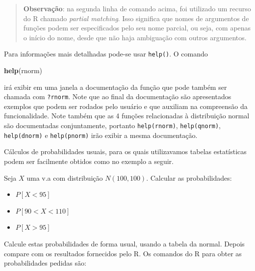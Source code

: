 \documentclass[10pt,a4paper]{book}
\newenvironment{Shaded}{\begin{snugshade}}{\end{snugshade}}
\newcommand{\KeywordTok}[1]{\textcolor[rgb]{0.13,0.29,0.53}{\textbf{#1}}}
\newcommand{\NormalTok}[1]{#1}
\providecommand{\tightlist}{%
  \setlength{\itemsep}{0pt}\setlength{\parskip}{0pt}}
\begin{document}
\begin{quote}
\textbf{Observação}: na segunda linha de comando acima, foi utilizado um
recurso do R chamado \emph{partial matching}. Isso significa que nomes
de argumentos de funções podem ser especificados pelo seu nome parcial,
ou seja, com apenas o início do nome, desde que não haja ambiguação com
outros argumentos.
\end{quote}

Para informações mais detalhadas pode-se usar \texttt{help()}. O comando

\begin{Shaded}
\begin{Highlighting}[]
\KeywordTok{help}\NormalTok{(rnorm)}
\end{Highlighting}
\end{Shaded}

irá exibir em uma janela a documentação da função que pode também ser
chamada com \texttt{?rnorm}. Note que ao final da documentação são
apresentados exemplos que podem ser rodados pelo usuário e que auxiliam
na compreensão da funcionalidade. Note também que as 4 funções
relacionadas à distribuição normal são documentadas conjuntamente,
portanto \texttt{help(rnorm)}, \texttt{help(qnorm)},
\texttt{help(dnorm)} e \texttt{help(pnorm)} irão exibir a mesma
documentação.

Cálculos de probabilidades usuais, para os quais utilizavamos tabelas
estatísticas podem ser facilmente obtidos como no exemplo a seguir.

Seja \(X\) uma v.a com distribuição \(N(100, 100)\). Calcular as
probabilidades:

\begin{itemize}
\tightlist
\item
  \(P[X < 95]\)
\item
  \(P[90 < X < 110]\)
\item
  \(P[X > 95]\)
\end{itemize}

Calcule estas probabilidades de forma usual, usando a tabela da normal.
Depois compare com os resultados fornecidos pelo R. Os comandos do R
para obter as probabilidades pedidas são:
\end{document}
